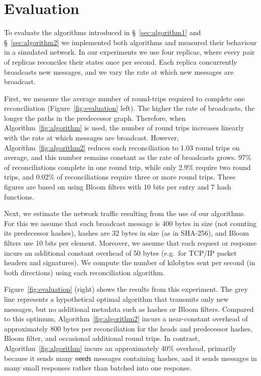\documentclass[a4paper,anonymous,USenglish]{lipics-v2019}
\begin{document}
\section{Evaluation}\label{sec:evaluation}

To evaluate the algorithms introduced in \S~\ref{sec:algorithm1} and \S~\ref{sec:algorithm2} we implemented both algorithms and measured their behaviour in a simulated network.
In our experiments we use four replicas, where every pair of replicas reconciles their states once per second.
Each replica concurrently broadcasts new messages, and we vary the rate at which new messages are broadcast.

First, we measure the average number of round-trips required to complete one reconciliation (Figure~\ref{fig:evaluation} left).
The higher the rate of broadcasts, the longer the paths in the predecessor graph.
Therefore, when Algorithm~\ref{fig:algorithm} is used, the number of round trips increases linearly with the rate at which messages are broadcast.
However, Algorithm~\ref{fig:algorithm2} reduces each reconciliation to 1.03 round trips on average, and this number remains constant as the rate of broadcasts grows.
97\% of reconciliations complete in one round trip, while only 2.9\% require two round trips, and 0.02\% of reconciliations require three or more round trips.
These figures are based on using Bloom filters with 10 bits per entry and 7 hash functions.

Next, we estimate the network traffic resulting from the use of our algorithms.
For this we assume that each broadcast message is 400 bytes in size (not counting its predecessor hashes), hashes are 32 bytes in size (as in SHA-256), and Bloom filters use 10 bits per element.
Moreover, we assume that each request or response incurs an additional constant overhead of 50 bytes (e.g.\ for TCP/IP packet headers and signatures).
We compute the number of kilobytes sent per second (in both directions) using each reconciliation algorithm.

Figure~\ref{fig:evaluation} (right) shows the results from this experiment.
The grey line represents a hypothetical optimal algorithm that transmits only new messages, but no additional metadata such as hashes or Bloom filters.
Compared to this optimum, Algorithm~\ref{fig:algorithm2} incurs a near-constant overhead of approximately 800 bytes per reconciliation for the heads and predecessor hashes, Bloom filter, and occasional additional round trips.
In contrast, Algorithm~\ref{fig:algorithm} incurs an approximately 40\% overhead, primarily because it sends many $\mathsf{needs}$ messages containing hashes, and it sends messages in many small responses rather than batched into one response.
\end{document}
